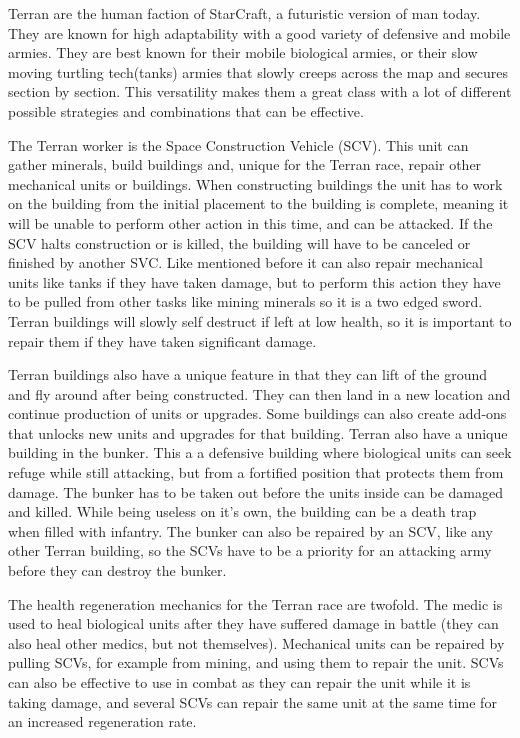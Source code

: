 Terran are the human faction of StarCraft, a futuristic version of man today.
They are known for high adaptability with a good variety of defensive and mobile
armies. They are best known for their mobile biological armies, or their slow
moving turtling tech(tanks) armies that slowly creeps across the map and secures
section by section. This versatility makes them a great class with a lot of
different possible strategies and combinations that can be effective.
 
The Terran worker is the Space Construction Vehicle (SCV). This unit can gather
minerals, build buildings and, unique for the Terran race, repair other
mechanical units or buildings. When constructing buildings the unit has to work
on the building from the initial placement to the building is complete, meaning
it will be unable to perform other action in this time, and can be attacked. If
the SCV halts construction or is killed, the building will have to be canceled
or finished by another SVC. Like mentioned before it can also repair mechanical
units like tanks if they have taken damage, but to perform this action they have
to be pulled from other tasks like mining minerals so it is a two edged sword.
Terran buildings will slowly self destruct if left at low health, so it is
important to repair them if they have taken significant damage.
 
Terran buildings also have a unique feature in that they can lift of the ground
and fly around after being constructed. They can then land in a new location and
continue production of units or upgrades. Some buildings can also create add-ons
that unlocks new units and upgrades for that building. Terran also have a unique
building in the bunker. This a a defensive building where  biological units can
seek refuge while still attacking, but from a fortified position that protects
them from damage. The bunker has to be taken out before the units inside can be
damaged and killed. While being useless on it's own, the building can be a death
trap when filled with infantry. The bunker can also be repaired by an SCV, like
any other Terran building, so the SCVs have to be a priority for an attacking
army before they can destroy the bunker.
 
The health regeneration mechanics for the Terran race are twofold. The medic is
used to heal biological units after they have suffered damage in battle (they
can also heal other medics, but not themselves). Mechanical units can be
repaired by pulling SCVs, for example from mining, and using them to repair the
unit. SCVs can also be effective to use in combat as they can repair the unit
while it is taking damage, and several SCVs can repair the same unit at the same
time for an increased regeneration rate.
 

